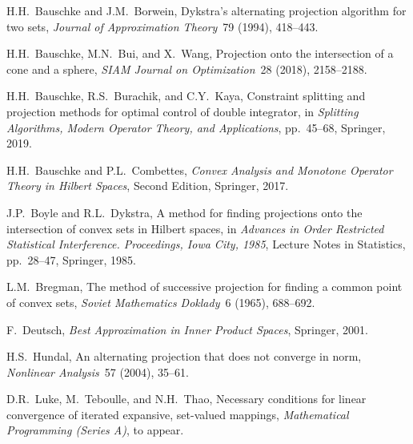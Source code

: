 \documentclass[12pt]{article}
\newcommand{\seppone}{\setlength{\itemsep}{-1pt}}
\begin{document}
\begin{thebibliography}{999}
\seppone

H.H.\ Bauschke and J.M.\ Borwein,
Dykstra's alternating projection algorithm
for two sets,
\emph{Journal of Approximation Theory}~79 (1994), 418--443. 

H.H.\ Bauschke, M.N.\ Bui, and X.\ Wang,
Projection onto the intersection of a cone
and a sphere,
\emph{SIAM Journal on Optimization}~28 (2018), 2158--2188.

H.H.\ Bauschke, R.S.\ Burachik, and C.Y.\ Kaya,
Constraint splitting and projection methods for 
optimal control of double integrator,
in 
\emph{Splitting Algorithms, Modern Operator Theory, 
and Applications}, pp.~45--68, Springer, 2019. 

H.H.\ Bauschke and P.L.\ Combettes,
\emph{Convex Analysis and Monotone 
Operator Theory in Hilbert Spaces},
Second Edition,
Springer, 2017.

J.P.\ Boyle and R.L.\ Dykstra,
A method for finding projections onto the intersection 
of convex sets in Hilbert spaces, in 
\emph{Advances in Order Restricted Statistical Interference. 
Proceedings, Iowa City, 1985}, 
Lecture Notes in Statistics, pp.~28--47, Springer, 1985. 

L.M.\ Bregman,
The method of successive projection for finding 
a common point of convex sets,
\emph{Soviet Mathematics Doklady}~6 (1965), 688--692. 

F.\ Deutsch,
\emph{Best Approximation in Inner Product Spaces},
Springer, 2001. 


H.S.\ Hundal,
An alternating projection that does not converge in norm,
\emph{Nonlinear Analysis}~57 (2004), 35--61. 

D.R.\ Luke, M.\ Teboulle, and N.H.\ Thao,
Necessary conditions for linear convergence of 
iterated expansive, set-valued mappings,
\emph{Mathematical Programming (Series A)}, to appear. 


\end{thebibliography}
\end{document}
